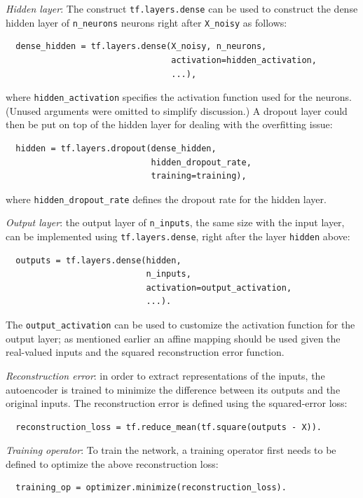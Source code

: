 \documentclass[12pt]{article}
\begin{document}
\textit{Hidden layer}: The construct \texttt{tf.layers.dense} can be used to construct the dense hidden layer of \texttt{n\_neurons} neurons right after \texttt{X\_noisy} as follows:
\begin{verbatim}
  dense_hidden = tf.layers.dense(X_noisy, n_neurons, 
                                 activation=hidden_activation,
                                 ...),
\end{verbatim}
\noindent
where \texttt{hidden\_activation} specifies the activation function used for the neurons. (Unused arguments were omitted to simplify discussion.) A dropout layer could then be put on top of the hidden layer for dealing with the overfitting issue:
\begin{verbatim}
  hidden = tf.layers.dropout(dense_hidden, 
                             hidden_dropout_rate,
                             training=training),
\end{verbatim}
where \texttt{hidden\_dropout\_rate} defines the dropout rate for the hidden layer.

\textit{Output layer}: the output layer of \texttt{n\_inputs}, the same size with the input layer, can be implemented using \texttt{tf.layers.dense}, right after the layer \texttt{hidden} above:
\begin{verbatim}
  outputs = tf.layers.dense(hidden, 
                            n_inputs, 
                            activation=output_activation,
                            ...).
\end{verbatim}
The \texttt{output\_activation} can be used to customize the activation function for the output layer; as mentioned earlier an affine mapping should be used given the real-valued inputs and the squared reconstruction error function.

\textit{Reconstruction error}: in order to extract representations of the inputs, the autoencoder is trained to minimize the difference between its outputs and the original inputs. The reconstruction error is defined using the squared-error loss:
\begin{verbatim}
  reconstruction_loss = tf.reduce_mean(tf.square(outputs - X)).
\end{verbatim}

\textit{Training operator}: To train the network, a training operator first needs to be defined to optimize the above reconstruction loss:
\begin{verbatim}
  training_op = optimizer.minimize(reconstruction_loss).
\end{verbatim}
\end{document}
